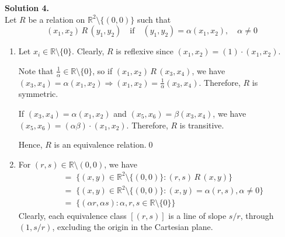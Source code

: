 \documentclass[10pt]{article}
\begin{document}
        \textbf{Solution 4.}\\
        Let $R$ be a relation on $\mathbb{R}^2\setminus\{(0,0)\}$ such that
        \[(x_1, x_2)\,R\,(y_1, y_2) \quad\text{if}\quad (y_1, y_2) = \alpha(x_1, x_2), \quad\alpha\neq 0\]
        \begin{enumerate}
                \item Let $x_i \in \mathbb{R}\setminus\{0\}$.
                Clearly, $R$ is reflexive since $(x_1, x_2) = (1)\cdot (x_1, x_2)$.

                Note that $\frac{1}{\alpha} \in \mathbb{R}\setminus\{0\}$, so if $(x_1, x_2)\,R\,(x_3, x_4)$, we have
                $(x_3, x_4)=\alpha(x_1, x_2) \Rightarrow (x_1, x_2) = \frac{1}{\alpha}(x_3, x_4)$. Therefore, $R$ is symmetric.
                
                If $(x_3, x_4) = \alpha(x_1, x_2)$ and $(x_5, x_6) = \beta(x_3, x_4)$, we have $(x_5, x_6) = (\alpha\beta)\cdot (x_1, x_2)$.
                Therefore, $R$ is transitive.

                Hence, $R$ is an equivalence relation.\qed
                
                \item For $(r, s) \in \mathbb{R}\setminus(0,0)$, we have
                \begin{align*}
                        [(r, s)] \;&=\; \{(x, y) \in \mathbb{R}^2\setminus\{(0, 0)\} : (r, s)\,R\,(x, y)\} \\
                                \;&=\; \{(x, y) \in \mathbb{R}^2\setminus\{(0, 0)\} : (x, y) = \alpha(r, s), \alpha \neq 0\} \\
                                \;&=\; \{(\alpha r, \alpha s) : \alpha, r, s \in \mathbb{R}\setminus\{0\}\}
                \end{align*}
                Clearly, each equivalence class $[(r, s)]$ is a line of slope $s/r$, through $(1, s/r)$, excluding the origin in the
                Cartesian plane.
        \end{enumerate}
\end{document}
